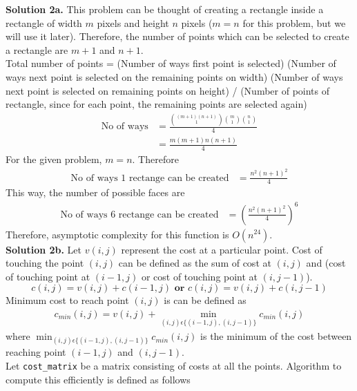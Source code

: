 \documentclass[11pt]{article}
\begin{document}
\textbf{Solution 2a.} This problem can be thought of creating a rectangle inside a rectangle of width $m$ pixels and height $n$ pixels ($m = n$ for this problem, but we will use it later). Therefore, the number of points which can be selected to create a rectangle are $m+1$ and $n+1$. \\
\linebreak
Total number of points  = (Number of ways first point is selected) (Number of ways next point is selected on the remaining points on width) (Number of ways next point is selected on remaining points on height) / (Number of points of rectangle, since for each point, the remaining points are selected again)
\begin{align*}
\text{No of ways} &= \frac{{(m+1)(n+1)\choose 1} {m\choose 1}{n\choose 1}}{4} \\
&= \frac{m(m+1)n(n+1)}{4}
\end{align*}
For the given problem, $m = n$. Therefore
\begin{align*}
\text{No of ways 1 rectange can be created} &= \frac{n^2(n+1)^2}{4}
\end{align*}
This way, the number of possible faces are \\
\begin{align*}
\text{No of ways 6 rectange can be created} &= (\frac{n^2(n+1)^2}{4})^6
\end{align*}
Therefore, asymptotic complexity for this function is $O(n^{24})$. \\
\linebreak
\textbf{Solution 2b.} Let $v(i, j)$ represent the cost at a particular point. Cost of touching the point $(i, j)$ can be defined as the sum of cost at $(i, j)$ and (cost of touching point at $(i-1, j)$ or cost of touching point at $(i, j-1)$). $$c(i, j) = v(i, j) + c(i-1, j) \textbf{ or } c(i, j) = v(i,j) + c(i, j-1)$$
Minimum cost to reach point $(i, j)$ is can be defined as \\
\begin{align*}
c_{min}(i, j) = v(i, j) + \min_{(i, j) \epsilon \{(i-1, j), (i, j-1)\}}c_{min}(i, j)
\end{align*}
where $\min_{(i, j) \epsilon \{(i-1, j), (i, j-1)\}}c_{min}(i, j)$ is the minimum of the cost between reaching point $(i-1, j)$ and $(i, j-1)$. \\
Let \lstinline{cost_matrix} be a matrix consisting of costs at all the points. Algorithm to compute this efficiently is defined as follows\\
\end{document}
